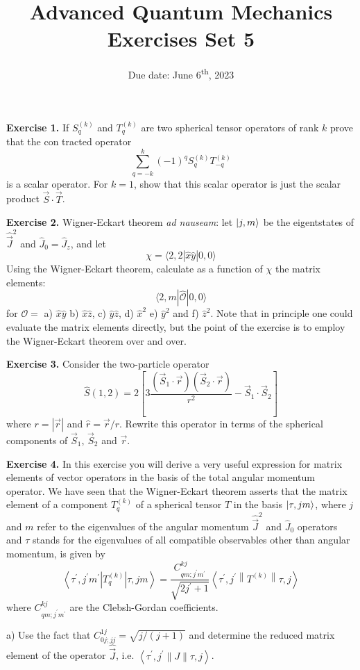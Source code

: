 \documentclass[12pt]{article}
\title{Advanced Quantum Mechanics\\Exercises Set 5\vspace{-0.5em}}
\date{Due date: June 6\textsuperscript{th}, 2023}
\begin{document}
\maketitle


\textbf{Exercise 1.} If \(S_{q}^{(k)}\) and \(T_{q}^{(k)}\) are two spherical tensor operators of rank \(k\) prove that the con%
tracted operator
\[
\sum_{q=-k}^{k}(-1)^{q} S_{q}^{(k)} T_{-q}^{(k)}
\]
is a scalar operator. For \(k=1\), show that this scalar operator is just the scalar product \(\vec{S} \cdot \vec{T}\).


\textbf{Exercise 2.} Wigner-Eckart theorem \textit{ad nauseam}: let $\ket{j,m}$ be the eigentstates of $\hat{\vec{J}}^2$ and $\hat{J}_0 = \hat{J}_z$,
and let
\[
\chi=\langle 2,2|\hat{x} \hat{y}| 0,0\rangle
\] 
Using the Wigner-Eckart theorem, calculate as a function of $\chi$ the matrix elements:
\[
\langle 2, m|\hat{\mathcal{O}}| 0,0\rangle
\]
for $\mathcal{O} = $
a) $\hat{x}\hat{y}$ b) $\hat{x} \hat{z}$, c) $\hat{y} \hat{z}$, d) $\hat{x}^{2}$ e) $\hat{y}^{2}$ and f) $\hat{z}^{2}$.
Note that in principle one could evaluate the matrix elements
directly, but the point of the exercise is to employ the Wigner-Eckart theorem over and over.


\textbf{Exercise 3.} Consider the two-particle operator
\[
\hat{S}(1,2)=2\left[3 \frac{\left(\vec{S}_{1} \cdot \vec{r}\right)\left(\vec{S}_{2} \cdot \vec{r}\right)}{r^{2}}-\vec{S}_{1} \cdot \vec{S}_{2}\right]
\]
where $r = |\vec{r}|$ and $\hat{r} = \vec{r}/r$. Rewrite this operator in terms of the spherical components of $\vec{S}_{1}$, $\vec{S}_{2}$ and $\vec{r}$.


\textbf{Exercise 4.} In this exercise you will derive a very useful expression for matrix elements of
vector operators in the basis of the total angular momentum operator. We have seen that the
Wigner-Eckart theorem asserts that the matrix element of a component $T_q^{(k)}$ of a spherical
tensor $T$ in the basis $\ket{\tau,jm}$, where $j$ and $m$ refer to the eigenvalues of the angular momentum
$\hat{\vec{J}}^2$ and $\hat{J}_0$ operators and $\tau$ stands for the eigenvalues of all compatible observables other than
angular momentum, is given by
\[
\left\langle\tau^{\prime}, j^{\prime} m^{\prime}\left|T_{q}^{(k)}\right| \tau, j m\right\rangle=\frac{C_{q m ; j^{\prime} m^{\prime}}^{k j}}{\sqrt{2 j^{\prime}+1}}\left\langle\tau^{\prime}, j^{\prime}\left\|T^{(k)}\right\| \tau, j\right\rangle
\]
where \(C_{q m ; j^{\prime} m^{\prime}}^{k j}\) are the Clebsh-Gordan coefficients.

a) Use the fact that \(C_{0 j ; j j}^{1 j}=\sqrt{j /(j+1)}\) and determine the reduced matrix element of the
operator \(\hat{\vec{J}}\), i.e. \(\left\langle\tau^{\prime}, j^{\prime}\|J\| \tau, j\right\rangle\).
\end{document}
